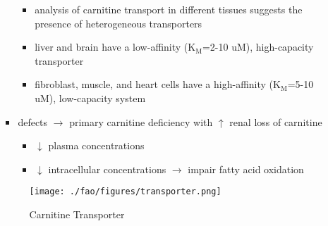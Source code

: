 \documentclass{scrartcl}
\begin{document}
\begin{enumerate}
\begin{enumerate}
\begin{itemize}
\begin{itemize}
\item analysis of carnitine transport in different tissues suggests the
presence of heterogeneous transporters
\item liver and brain have a low-affinity (K\(_{\text{M}}\)=2-10 uM), high-capacity transporter
\item fibroblast, muscle, and heart cells have a high-affinity (K\(_{\text{M}}\)=5-10 uM), low-capacity system
\end{itemize}
\item defects \(\to\) primary carnitine deficiency with \(\uparrow\) renal loss of carnitine
\begin{itemize}
\item \(\downarrow\) plasma concentrations
\item \(\downarrow\) intracellular concentrations \(\to\) impair fatty acid
oxidation
\end{itemize}
\end{itemize}

\begin{figure}[htbp]
\centering
\texttt{[image: ./fao/figures/transporter.png]}
\caption{\label{fig:orgba8d766}
Carnitine Transporter}
\end{figure}


\end{enumerate}
\end{enumerate}
\end{document}

